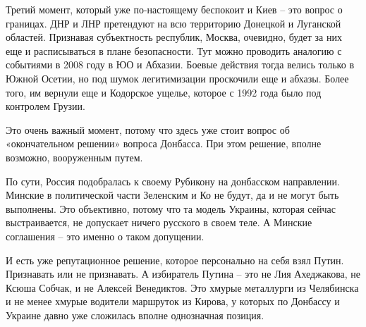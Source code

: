 Третий момент, который уже по-настоящему беспокоит и Киев – это вопрос о
границах. ДНР и ЛНР претендуют на всю территорию Донецкой и Луганской областей.
Признавая субъектность республик, Москва, очевидно, будет за них еще и
расписываться в плане безопасности. Тут можно проводить аналогию с событиями в
2008 году в ЮО и Абхазии. Боевые действия тогда велись только в Южной Осетии,
но под шумок легитимизации проскочили еще и абхазы. Более того, им вернули еще
и Кодорское ущелье, которое с 1992 года было под контролем Грузии.

Это очень важный момент, потому что здесь уже стоит вопрос об «окончательном
решении» вопроса Донбасса. При этом решение, вполне возможно, вооруженным
путем.

По сути, Россия подобралась к своему Рубикону на донбасском направлении.
Минские в политической части Зеленским и Ко не будут, да и не могут быть
выполнены. Это объективно, потому что та модель Украины, которая сейчас
выстраивается, не допускает ничего русского в своем теле. А Минские соглашения
– это именно о таком допущении.

И есть уже репутационное решение, которое персонально на себя взял Путин.
Признавать или не признавать. А избиратель Путина – это не Лия Ахеджакова, не
Ксюша Собчак, и не Алексей Венедиктов. Это хмурые металлурги из Челябинска и не
менее хмурые водители маршруток из Кирова, у которых по Донбассу и Украине
давно уже сложилась вполне однозначная позиция.
